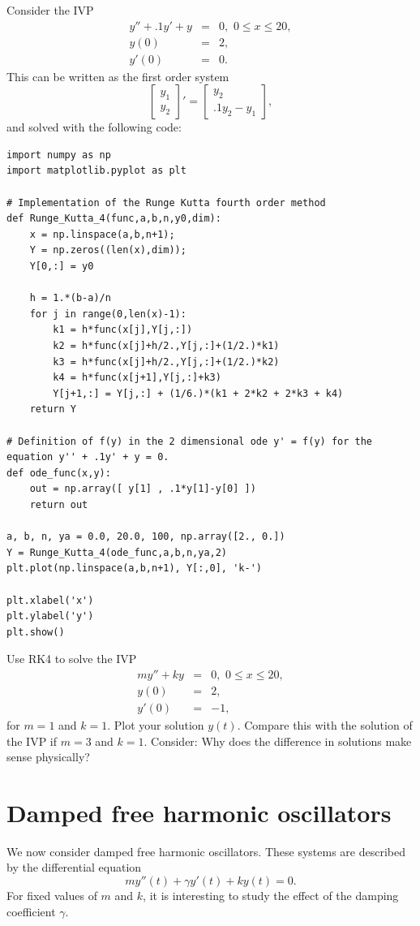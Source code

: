 Consider the IVP 
\begin{eqnarray*}
y'' + .1y ' +y &=& 0,\,\, 0 \leq x  \leq 20, \\
y(0) &=&2,\\
y'(0) &=& 0.
\end{eqnarray*}
This can be written as the first order system
\[ \left[\begin{array}{c}y_1 \\y_2\end{array}\right]' = \left[\begin{array}{c}y_2 \\.1y_2-y_1\end{array}\right],
\]
and solved with the following code: 
\begin{lstlisting}
import numpy as np
import matplotlib.pyplot as plt

# Implementation of the Runge Kutta fourth order method
def Runge_Kutta_4(func,a,b,n,y0,dim):
	x = np.linspace(a,b,n+1); 
	Y = np.zeros((len(x),dim)); 
	Y[0,:] = y0
	
	h = 1.*(b-a)/n
	for j in range(0,len(x)-1): 
		k1 = h*func(x[j],Y[j,:])
		k2 = h*func(x[j]+h/2.,Y[j,:]+(1/2.)*k1)
		k3 = h*func(x[j]+h/2.,Y[j,:]+(1/2.)*k2)
		k4 = h*func(x[j+1],Y[j,:]+k3)
		Y[j+1,:] = Y[j,:] + (1/6.)*(k1 + 2*k2 + 2*k3 + k4)
	return Y

# Definition of f(y) in the 2 dimensional ode y' = f(y) for the equation y'' + .1y' + y = 0.
def ode_func(x,y): 
	out = np.array([ y[1] , .1*y[1]-y[0] ])
	return out

a, b, n, ya = 0.0, 20.0, 100, np.array([2., 0.])
Y = Runge_Kutta_4(ode_func,a,b,n,ya,2)
plt.plot(np.linspace(a,b,n+1), Y[:,0], 'k-')

plt.xlabel('x')
plt.ylabel('y')
plt.show()
\end{lstlisting}


\begin{problem}
Use RK4 to solve the IVP
\begin{eqnarray*}
my'' + ky &=& 0,\,\, 0 \leq x \leq 20, \\
y(0) &=& 2, \\
y'(0) &=& -1,
\end{eqnarray*} 
for $m = 1$ and $k =1$.  Plot your solution $y(t)$.  Compare this with the solution of the IVP if  $m = 3$ and $k =1$. Consider: Why does the difference in solutions make sense physically?
\end{problem}

\section*{Damped free harmonic oscillators}
We now consider damped free harmonic oscillators. These systems are described by the differential equation
\[my''(t) +\gamma y'(t) + ky(t) = 0.\]
For fixed values of $m$ and $k$, it is interesting to study the effect of the damping coefficient $\gamma$. 

